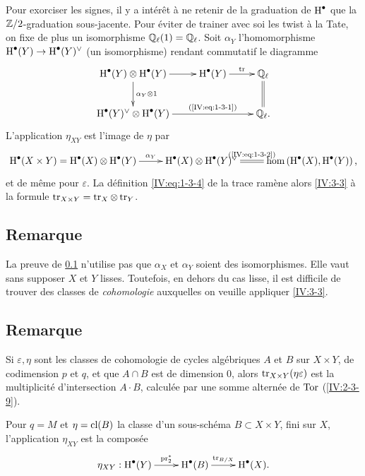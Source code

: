 Pour exorciser les signes, il y a intérêt à ne retenir de la graduation 
de $\operatorname{H}^\bullet$ que la $\mathbb{Z}/2$-graduation sous-jacente. Pour éviter de 
trainer avec soi les twist à la Tate, on fixe de plus un isomorphisme 
$\mathbb{Q}_\ell(1)=\mathbb{Q}_\ell$. Soit $\alpha_Y$ l'homomorphisme 
$\operatorname{H}^\bullet(Y)\to \operatorname{H}^\bullet(Y)^\vee$ (un isomorphisme) rendant commutatif le 
diagramme 
\[\xymatrix{
  \h^\bullet(Y)\otimes \h^\bullet(Y) \ar[r] \ar[d]^-{\alpha_Y\otimes 1} 
    & \h^\bullet(Y) \ar[r]^-{\tr} 
    & \dQ_\ell \ar@{=}[d] \\
  \h^\bullet(Y)^\vee \otimes \h^\bullet(Y) \ar[rr]^-{\text{(\ref{IV:eq:1-3-1})}} 
    & & \dQ_\ell \text{.}
}\]
L'application $\eta_{X Y}$ est l'image de $\eta$ par 
\[\xymatrix{
  \h^\bullet(X\times Y) = \h^\bullet(X)\otimes \h^\bullet(Y) \ar[r]^-{\alpha_Y} 
    & \h^\bullet(X) \otimes \h^\bullet(Y)^\vee \ar@{=}[r]^-{\text{(\ref{IV:eq:1-3-2})}} 
    & \hom\left(\h^\bullet(X),\h^\bullet(Y)\right) \text{,}
}\]
et de même pour $\varepsilon$. La définition \ref{IV:eq:1-3-4} de la trace 
ramène alors \ref{IV:3-3} à la formule 
$\operatorname{tr}_{X\times Y}=\operatorname{tr}_X\otimes \operatorname{tr}_Y$. 





\subsection{Remarque}\label{IV:3-4}

La preuve de \ref{IV:3-4} n'utilise pas que $\alpha_X$ et $\alpha_Y$ soient des 
isomorphismes. Elle vaut sans supposer $X$ et $Y$ lisses. Toutefois, en dehors 
du cas lisse, il est difficile de trouver des classes de \emph{cohomologie} 
auxquelles on veuille appliquer \ref{IV:3-3}. 





\subsection{Remarque}\label{IV:3-5}

Si $\varepsilon,\eta$ sont les classes de cohomologie de cycles algébriques 
$A$ et $B$ sur $X\times Y$, de codimension $p$ et $q$, et que $A\cap B$ est de 
dimension $0$, alors $\operatorname{tr}_{X\times Y}(\eta\varepsilon)$ est la multiplicité 
d'intersection $A\cdot B$, calculée par une somme alternée de $\operatorname{Tor}$ 
(\ref{IV:2-3-9}). 





\begin{proposition_}\label{IV:3-6}
Pour $q=M$ et $\eta=\operatorname{cl}(B)$ la classe d'un sous-schéma $B\subset X\times Y$, 
fini sur $X$, l'application $\eta_{X Y}$ est la composée 
\[\xymatrix{
  \eta_{X Y} : \h^\bullet(Y) \ar[r]^-{\operatorname{pr}_2^\ast} 
    & \h^\bullet(B) \ar[r]^-{\tr_{B/X}} 
    & \h^\bullet(X) \text{.}
}\]
\end{proposition_}

